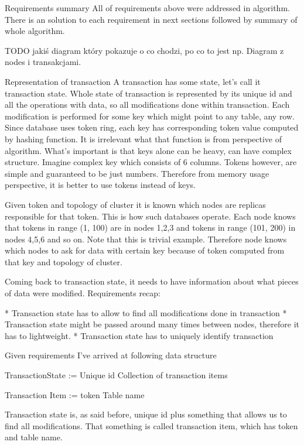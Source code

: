         Requirements summary
All of requirements above were addressed in algorithm. There is an solution to each requirement in next sections followed by summary of whole algorithm.


TODO jakiś diagram który pokazuje o co chodzi, po co to jest np. Diagram z nodes i transakcjami.


Representation of transaction
A transaction has some state, let’s call it transaction state. Whole state of transaction is represented by its unique id and all the operations with data, so all modifications done within transaction. Each modification is performed for some key which might point to any table, any row. Since database uses token ring, each key has corresponding token value computed by hashing function. It is irrelevant what that function is from perspective of algorithm. What’s important is that keys alone can be heavy, can have complex structure. Imagine complex key which consists of 6 columns. Tokens however, are simple and guaranteed to be just numbers. Therefore from memory usage perspective, it is better to use tokens instead of keys.


Given token and topology of cluster it is known which nodes are replicas responsible for that token. This is how such databases operate. Each node knows that tokens in range (1, 100) are in nodes 1,2,3 and tokens in range (101, 200) in nodes 4,5,6 and so on. Note that this is trivial example.
Therefore node knows which nodes to ask for data with certain key because of token computed from that key and topology of cluster.


Coming back to transaction state, it needs to have information about what pieces of data were modified. Requirements recap:


* Transaction state has to allow to find all modifications done in transaction
* Transaction state might be passed around many times between nodes, therefore it has to lightweight.
* Transaction state has to uniquely identify transaction


Given requirements I’ve arrived at following data structure


TransactionState :=
        Unique id
        Collection of transaction items 


Transaction Item :=
        token
        Table name


Transaction state is, as said before, unique id plus something that allows us to find all modifications. That something is called transaction item, which has token and table name. 


